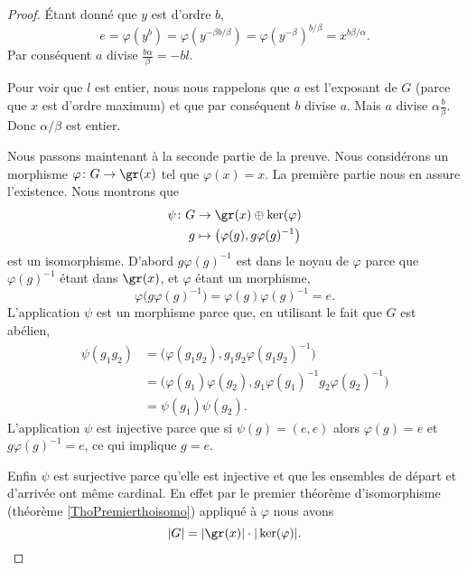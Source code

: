 \begin{proof}
    Étant donné que \( y\) est d'ordre \( b\),
    \begin{equation}
        e=\varphi(y^b)=\varphi(y^{-\beta b/\beta})=\varphi(y^{-\beta})^{b/\beta}=x^{b\beta/\alpha}.
    \end{equation}
    Par conséquent \( a\) divise \( \frac{ b\alpha }{ \beta }=-bl\).

    Pour voir que \( l\) est entier, nous nous rappelons que \( a\) est l'exposant de \( G\) (parce que \( x\) est d'ordre maximum) et que par conséquent \( b\) divise \( a\). Mais \( a\) divise \( \alpha\frac{ b }{ \beta }\). Donc \( \alpha/\beta\) est entier.

    Nous passons maintenant à la seconde partie de la preuve. Nous considérons un morphisme \( \varphi\colon G\to \gr(x)\) tel que \( \varphi(x)=x\). La première partie nous en assure l'existence. Nous montrons que 
    \begin{equation}
        \begin{aligned}
            \psi\colon G&\to \gr(x)\oplus \ker(\varphi) \\
            g&\mapsto \big( \varphi(g),g\varphi(g)^{-1} \big) 
        \end{aligned}
    \end{equation}
    est un isomorphisme. D'abord \( g\varphi(g)^{-1}\) est dans le noyau de \( \varphi\) parce que \( \varphi(g)^{-1}\) étant dans \( \gr(x)\), et \( \varphi\) étant un morphisme,
    \begin{equation}
        \varphi\big( g\varphi(g)^{-1} \big)=\varphi(g)\varphi(g)^{-1}=e.
    \end{equation}
    L'application \( \psi\) est un morphisme parce que, en utilisant le fait que \( G\) est abélien,
    \begin{subequations}
        \begin{align}
            \psi(g_1g_2)&=\big( \varphi(g_1g_2),g_1g_2\varphi(g_1g_2)^{-1} \big)\\
            &=\big( \varphi(g_1)\varphi(g_2),g_1\varphi(g_1)^{-1}g_2\varphi(g_2)^{-1} \big)\\
            &=\psi(g_1)\psi(g_2).
        \end{align}
    \end{subequations}
    L'application \( \psi\) est injective parce que si \( \psi(g)=(e,e)\) alors \( \varphi(g)=e\) et \( g\varphi(g)^{-1}=e\), ce qui implique \( g=e\).

    Enfin \( \psi\) est surjective parce qu'elle est injective et que les ensembles de départ et d'arrivée ont même cardinal. En effet par le premier théorème d'isomorphisme (théorème \ref{ThoPremierthoisomo}) appliqué à \( \varphi\) nous avons
    \begin{equation}
        | G |=| \gr(x) |\cdot | \ker(\varphi) |.
    \end{equation}
\end{proof}

